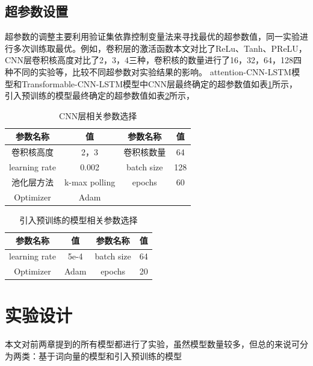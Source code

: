 \subsection{超参数设置}
超参数的调整主要利用验证集依靠控制变量法来寻找最优的超参数值，同一实验进行多次训练取最优。例如，卷积层的激活函数本文对比了ReLu、Tanh、PReLU，
CNN层卷积核高度对比了2，3，4三种，卷积核的数量进行了16，32，64，128四种不同的实验等，比较不同超参数对实验结果的影响。
attention-CNN-LSTM模型和Transformable-CNN-LSTM模型中CNN层最终确定的超参数值如表\ref{tab:cnnPara}所示，
引入预训练的模型最终确定的超参数值如表\ref{tab:bertPara}所示，

\begin{table}[htb]
  \centering
  \caption{CNN层相关参数选择}
  \label{tab:cnnPara}
\begin{tabular}{cc|cc}
\hline
参数名称&值&参数名称&值\\
\hline
卷积核高度&2，3&卷积核数量&64\\
learning rate&0.002&batch size&128\\
池化层方法&k-max polling&epochs &60\\
Optimizer&Adam&&\\
\hline
\end{tabular}
\end{table}

\begin{table}[htb]
  \centering
  \caption{引入预训练的模型相关参数选择}
  \label{tab:bertPara}
\begin{tabular}{cc|cc}
\hline
参数名称&值&参数名称&值\\
\hline
learning rate&5e-4&batch size&64\\
Optimizer&Adam&epochs &20\\

\hline
\end{tabular}
\end{table}

\section{实验设计}
本文对前两章提到的所有模型都进行了实验，虽然模型数量较多，但总的来说可分为两类：基于词向量的模型和引入预训练的模型
